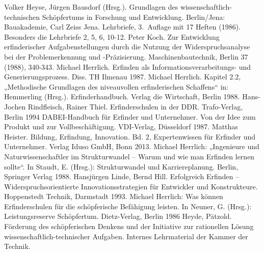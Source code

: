 \documentclass[11pt,a4paper]{article}
\begin{document}
\begin{thebibliography}{xxx}
 Volker Heyse, Jürgen Bausdorf (Hrsg.). Grundlagen des
  wissenschaftlich-technischen Schöpfertums in Forschung und Entwicklung.
  Berlin/Jena: Bauakademie, Carl Zeiss Jena. Lehrbriefe, 3.~Auflage mit 17
  Heften (1986).  Besonders die Lehrbriefe 2, 5, 6, 10-12.
 Peter Koch. Zur Entwicklung erfinderischer Aufgabenstellungen
  durch die Nutzung der Widerspruchsanalyse bei der Problemerkennung und
  -Präzisierung. Maschinenbautechnik, Berlin 37 (1988), 340-343.
 Michael Herrlich. Erfinden als Informationsverarbeitungs- und
  Generierungsprozess. Diss. TH Ilmenau 1987.
 Michael Herrlich. Kapitel 2.2, „Methodische Grundlagen des
  niveauvollen erfinderischen Schaffens“ in: Hemmerling (Hrsg.).
  Erfinderhandbuch. Verlag die Wirtschaft, Berlin 1988.
 Hans-Jochen Rindfleisch, Rainer Thiel. Erfinderschulen in der
  DDR.  Trafo-Verlag, Berlin 1994
 DABEI-Handbuch für Erfinder und Unternehmer. Von der Idee zum
  Produkt und zur Vollbeschäftigung. VDI-Verlag, Düsseldorf 1987.
 Matthas Heister. Bildung, Erfindung, Innovation. Bd. 2,
  Expertenwissen für Erfinder und Unternehmer. Verlag Iduso GmbH, Bonn 2013.
 Michael Herrlich: „Ingenieure und Naturwissenschaftler im
  Strukturwandel – Warum und wie man Erfinden lernen sollte“. In Staudt,
  E. (Hrsg.): Strukturwandel und Karriereplanung. Berlin, Springer Verlag
  1988.
 Hansjürgen Linde, Bernd Hill. Erfolgreich Erfinden –
  Widerspruchsorientierte Innovationsstrategien für Entwickler und
  Konstrukteure. Hoppenstedt Technik, Darmstadt 1993.
 Michael Herrlich: Was können Erfinderschulen für die
  schöpferische Befähigung leisten. In Neuner, G. (Hrsg.): Leistungsreserve
  Schöpfertum.  Dietz-Verlag, Berlin 1986
 Heyde, Pätzold. Förderung des schöpferischen Denkens und der
  Initiative zur rationellen Lösung wissenschaftlich-technischer Aufgaben.
  Internes Lehrmaterial der Kammer der Technik.
\end{thebibliography}
\end{document}
